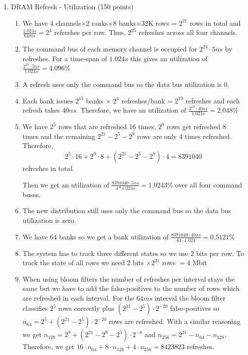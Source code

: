 \documentclass[a4paper]{article}
\begin{document}
\begin{enumerate}
    \item DRAM Refresh - Utilization (150 points)
        \begin{enumerate}
            \item We have 4 channels$\times$2 ranks$\times$8 banks$\times$32K rows = $2^{21}$ rows in total
                and $\frac{1.024s}{64ms} = 2^4$ refreshes per row. Thus, $2^{25}$ refreshes across all 
                four channels.

            \item The command bus of each memory channel is occupied for $2^{23}\cdot5ns$ by refreshes. For a
                time-span of $1.024s$ this gives an utilization of $\frac{2^{23}\cdot5ns}{1.024s}=4.096\%$ 

            \item A refresh uses only the command bus so the data bus utilization is 0.

            \item Each bank issues $2^{15}$ banks $\times$ $2^4$ refreshes/bank = $2^{19}$ refreshes and each
                refresh takes $40ns$. Therefore, we have an utilization of
                $\frac{2^{19}\cdot40ns}{1.024s}=2.048\%$
            
            \item We have $2^5$ rows that are refreshed 16 times, $2^9$ rows get refreshed 8 times and
                the remaining $2^{21} - 2^5 - 2^9$ rows are only 4 times refreshed. Therefore,
                \[ 2^5\cdot16 + 2^9\cdot8 + (2^{21} - 2^5 - 2^9)\cdot4 = 8391040\] refreshes in total.

                Then we get an utilization of $\frac{8391040\cdot5ns}{4*1.024s}=1.0243\%$ over all four 
                command buses.
            
            \item The new distribution still uses only the command bus so the data bus utilization is zero. 

            \item We have 64 banks so we get a bank utilization of $\frac{8391040\cdot40ns}{64\cdot1.024}=
                0.5121\%$

            \item The system has to track three different states so we use 2 bits per row. To track the state
                of all rows we need $2$ bits $\times2^{21}$ rows $=4$ Mbit

            \item When using bloom filters the number of refreshes per interval stays the same but we have
                to add the false-positives to the number of rows which are refreshed in each interval. For
                the $64ms$ interval the bloom filter classifies $2^5$ rows correctly plus 
                $(2^{21}-2^5)\cdot2^{-20}$ false-positives so $n_{64}=2^5 + (2^{21}-2^5)\cdot2^{-20}$ rows are 
                refreshed. With a similar reasoning we get $n_{128}=2^9 + (2^{21}-2^9-2^5)\cdot2^{-8}$ and
                $n_{256} = 2^{21} - n_{64} - n_{128}$. Therefore, we get $16 \cdot n_{64} + 8\cdot n_{128} +
                4\cdot n_{256} = 8423823$ refreshes.


\end{enumerate}
\end{enumerate}
\end{document}
